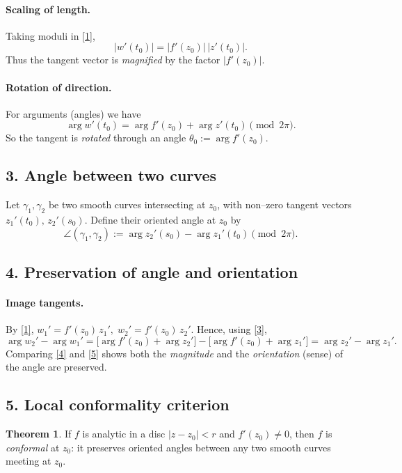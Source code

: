 \documentclass[12pt]{article}
\theoremstyle{definition} %
\newtheorem{theorem}{Theorem}
\theoremstyle{plain} %
\begin{document}
\paragraph{Scaling of length.}
Taking moduli in \eqref{1},
\[
   |w'(t_{0})| = |f'(z_{0})|\,|z'(t_{0})| .       \tag{2}
\]
Thus the tangent vector is \emph{magnified} by the factor $|f'(z_{0})|$.

\paragraph{Rotation of direction.}
For arguments (angles) we have
\[
   \arg w'(t_{0}) = \arg f'(z_{0}) + \arg z'(t_{0})\pmod{2\pi}. \tag{3}
\]
So the tangent is \emph{rotated} through an angle
$\theta_{0}:=\arg f'(z_{0})$.

\subsection*{3.\;  Angle between two curves}

Let $\gamma_{1},\gamma_{2}$ be two smooth curves intersecting at $z_{0}$, with
non--zero tangent vectors $z_{1}'(t_{0}),\,z_{2}'(s_{0})$.
Define their oriented angle at $z_{0}$ by
\[
   \angle(\gamma_{1},\gamma_{2}) := 
   \arg z_{2}'(s_{0}) - \arg z_{1}'(t_{0}) \pmod{2\pi}. \tag{4}
\]

\subsection*{4.\;  Preservation of angle and orientation}

\paragraph{Image tangents.}
By \eqref{1},
\(
   w_{1}' = f'(z_{0})\,z_{1}',\;
   w_{2}' = f'(z_{0})\,z_{2}' .
\)
Hence, using \eqref{3},
\[
   \arg w_{2}' - \arg w_{1}'
   = \bigl[\arg f'(z_{0})+\arg z_{2}'\bigr]
     -\bigl[\arg f'(z_{0})+\arg z_{1}'\bigr]
   = \arg z_{2}'-\arg z_{1}'. \tag{5}
\]
Comparing \eqref{4} and \eqref{5} shows both the \emph{magnitude} and the
\emph{orientation} (sense) of the angle are preserved.

\subsection*{5.\;  Local conformality criterion}

\begin{theorem}
\label{thm:local}
If $f$ is analytic in a disc $|z-z_{0}|<r$ and $f'(z_{0})\neq0$, then
$f$ is \emph{conformal} at $z_{0}$: it preserves oriented angles between any
two smooth curves meeting at $z_{0}$.
\end{theorem}
\end{document}
